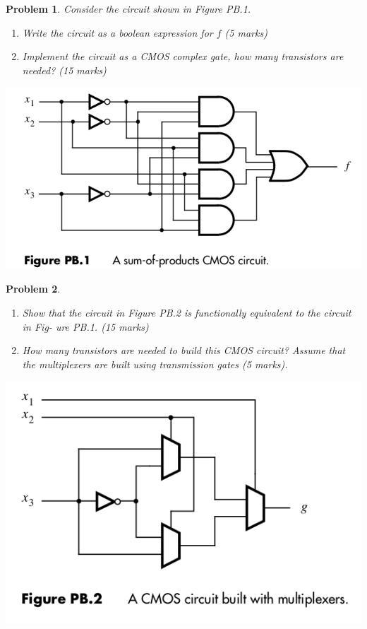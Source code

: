 \documentclass{article}
\newtheorem{prob}{Problem}
\begin{document}
\begin{prob}
  Consider the circuit shown in Figure PB.1.
  \begin{enumerate}
    \item Write the circuit as a boolean expression for $f$ (5 marks)
    \item Implement the circuit as a CMOS complex gate, how many transistors are
      needed? (15 marks)
    \end{enumerate}
    \includegraphics[width=0.6\linewidth]{./fig/figPB.1-SOP-CMOS.png}
\end{prob}
\begin{prob}
  \begin{enumerate}
  \item Show that the circuit in Figure PB.2 is functionally equivalent to the
    circuit in Fig- ure PB.1. (15 marks)
  \item How many transistors are needed to build this CMOS circuit? Assume that
    the multiplexers are built using transmission gates (5 marks).
  \end{enumerate}
  \includegraphics[width=0.6\linewidth]{./fig/figPB.2-CMOS-multiplexer.png}
\end{prob}
\end{document}
